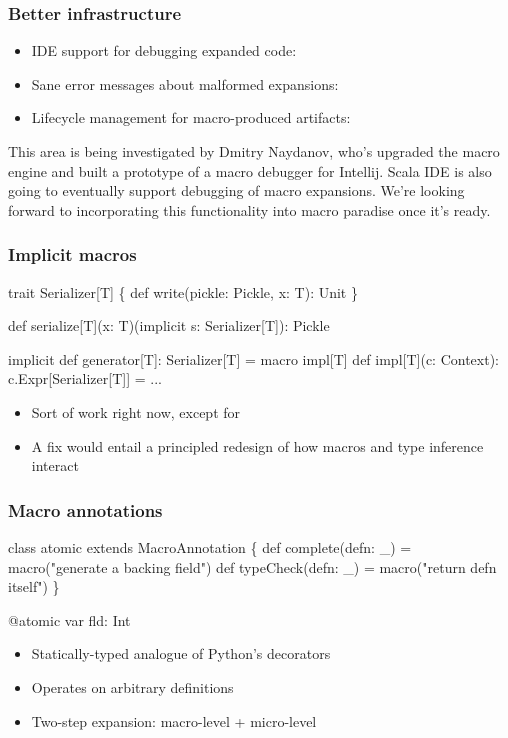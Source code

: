 \documentclass[svgnames,hyperref={bookmarks=false}]{beamer}
\begin{document}
\begin{frame}[fragile]
\frametitle{Better infrastructure}

\begin{itemize}
\item IDE support for debugging expanded code: 
\item Sane error messages about malformed expansions: 
\item Lifecycle management for macro-produced artifacts: 
\end{itemize}

This area is being investigated by Dmitry Naydanov, who's upgraded the macro engine and built a prototype of a macro debugger for Intellij. Scala IDE is also going to eventually support debugging of macro expansions. We're looking forward to incorporating this functionality into macro paradise once it's ready.
\end{frame}

\begin{frame}[fragile]
\frametitle{Implicit macros}
\begin{semiverbatim}
trait Serializer[T] \{
  def write(pickle: Pickle, x: T): Unit
\}

def serialize[T](x: T)(implicit s: Serializer[T]): Pickle

implicit def generator[T]: Serializer[T] = macro impl[T]
def impl[T](c: Context): c.Expr[Serializer[T]] = ...

\end{semiverbatim}

\begin{itemize}
\item Sort of work right now, except for 
\item A fix would entail a principled redesign of how macros and type inference interact 
\end{itemize}
\end{frame}

\begin{frame}[fragile]
\frametitle{Macro annotations}
\begin{semiverbatim}
class atomic extends MacroAnnotation \{
  def complete(defn: _) = macro("generate a backing field")
  def typeCheck(defn: _) = macro("return defn itself")
\}

@atomic var fld: Int

\end{semiverbatim}

\begin{itemize}
\item Statically-typed analogue of Python's decorators
\item Operates on arbitrary definitions
\item Two-step expansion: macro-level + micro-level
\end{itemize}
\end{frame}
\end{document}
